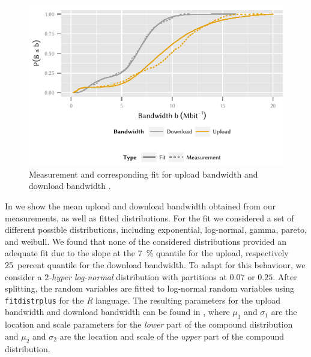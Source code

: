 \begin{figure}
  \includegraphics{application/cloud_file_synchronization/application_measurements/figures/bandwidths}
  \caption{Measurement and corresponding fit for upload bandwidth \uploadbandwidth and download bandwidth \downloadbandwidth.}
  \label{fig:application:cloud_file_synchronisation:application_measurements:bandwidth_preparation_times:measurement_setup:bandwidths}
\end{figure}

In  we show the mean upload and download bandwidth obtained from our measurements, as well as fitted distributions.
For the fit we considered a set of different possible distributions, including exponential, log-normal, gamma, pareto, and weibull.
We found that none of the considered distributions provided an adequate fit due to the slope at the \SI{7}{\percent} quantile for the upload, respectively \SI{25}{percent} quantile for the download bandwidth.
To adapt for this behaviour, we consider a \emph{$2$-hyper log-normal} distribution \cite{Wang2006} with partitions at \(0.07\) or \({0.25}\).
After splitting, the random variables are fitted to log-normal random variables using \texttt{fitdistrplus} for the \emph{R} language.
The resulting parameters for the upload bandwidth \uploadbandwidth and download bandwidth \downloadbandwidth can be found in , where \(\mu_1\) and \(\sigma_1\) are the location and scale parameters for the \emph{lower} part of the compound distribution and \(\mu_2\) and \(\sigma_2\) are the location and scale of the \emph{upper} part of the compound distribution.

